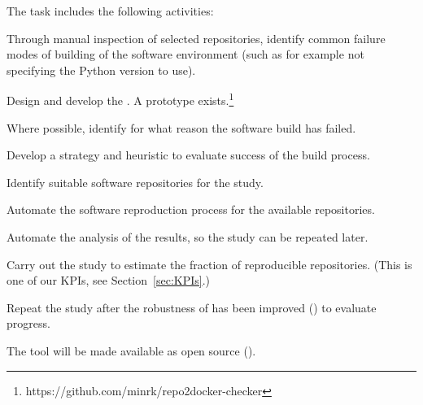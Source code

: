 \begin{task}
The task includes the following activities:
\begin{compactitem}
  \item Through manual inspection of selected repositories, identify common
    failure modes of building of the software environment (such as for example
    not specifying the Python version to use).
  \item Design and develop the . A prototype
    exists.\footnote{https://github.com/minrk/repo2docker-checker}
  \item Where possible, identify for what reason the software build has failed.
  \item Develop a strategy and heuristic to evaluate success of the build
    process.
  \item Identify suitable software repositories for the study.
  \item Automate the software reproduction process for the available
    repositories.
  \item Automate the analysis of the results, so the study can be repeated later.
  \item Carry out the study to estimate the fraction of reproducible
    repositories. (This is one of our KPIs, see Section~\ref{sec:KPIs}.)
  \item Repeat the study after the robustness of \repotodocker{} has
    been improved () to evaluate
    progress.
  \end{compactitem}

  The tool will be made available as open source
  ().

\end{task}
